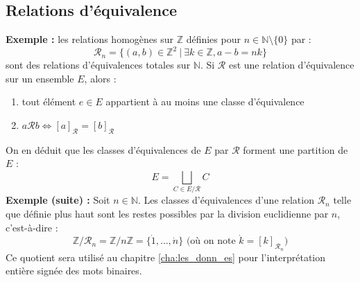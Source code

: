 \documentclass[../../main.tex]{subfiles}
\begin{document}
\subsection{Relations d'équivalence}
\textbf{Exemple :} les relations homogènes sur $\mathbb{Z}$ définies pour $n\in\mathbb{N}\setminus \{0\}$ par :
$$
\mathcal{R}_n = \{(a, b)\in \mathbb{Z}^2\ |\ \exists k\in\mathbb{Z}, a - b = nk\}
$$
sont des relations d'équivalences totales sur $\mathbb{N}$.
 Si $\mathcal{R}$ est une relation d'équivalence sur un ensemble $E$, alors :
\begin{enumerate}
	\item tout élément $e\in E$ appartient à au moins une classe d'équivalence
	\item $a\mathcal{R}b \Leftrightarrow [a]_{\mathcal{R}} = [b]_{\mathcal{R}}$
\end{enumerate}
On en déduit que les classes d'équivalences de $E$ par $\mathcal{R}$ forment une partition de $E$ :
$$
E = \displaystyle\bigsqcup_{C\in E/\mathcal{R}}C
$$
\textbf{Exemple (suite) :} Soit $n\in\mathbb{N}$. Les classes d'équivalences d'une relation $\mathcal{R}_{n}$ telle que définie plus haut sont les restes possibles par la division euclidienne par $n$, c'est-à-dire :
$$
\mathbb{Z}/\mathcal{R}_n = \mathbb{Z}/n\mathbb{Z} = \{\dot{1}, \dots, \dot{n}\} \text{ (où on note $\dot{k} = [k]_{\mathcal{R}_n}$)}
$$
Ce quotient sera utilisé au chapitre \ref{cha:les_donn_es} pour l'interprétation entière signée des mots binaires.
\end{document}
